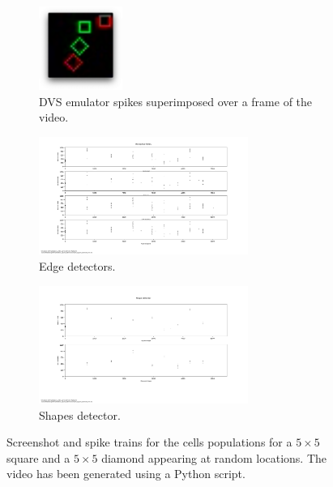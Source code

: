 \begin{figure}[ht]
\centering

\begin{subfigure}{\textwidth}
\centering
\includegraphics[width=0.3\textwidth]{images/appendix_evaluation/random_spikes.png}
\caption{DVS emulator spikes superimposed over a frame of the video.}
\label{fig:random_spikes}
\end{subfigure}

\begin{subfigure}{\textwidth}
\centering
\includegraphics[width=0.75\textwidth]{images/appendix_evaluation/random_receptive_fields.png} 
\caption{Edge detectors.}
\label{fig:random_receptive_fields}
\end{subfigure}

\begin{subfigure}{\textwidth}
\centering
\includegraphics[width=0.75\textwidth]{images/appendix_evaluation/random_shape.png}
\caption{Shapes detector.}
\label{fig:random_shape}
\end{subfigure}

\caption[Square and Diamond Moving Randomly]{Screenshot and spike trains for the cells populations for a $5\times 5$ square and a $5\times 5$ diamond appearing at random locations. The video has been generated using a Python script.}
\label{fig:random_ev}
\end{figure}



